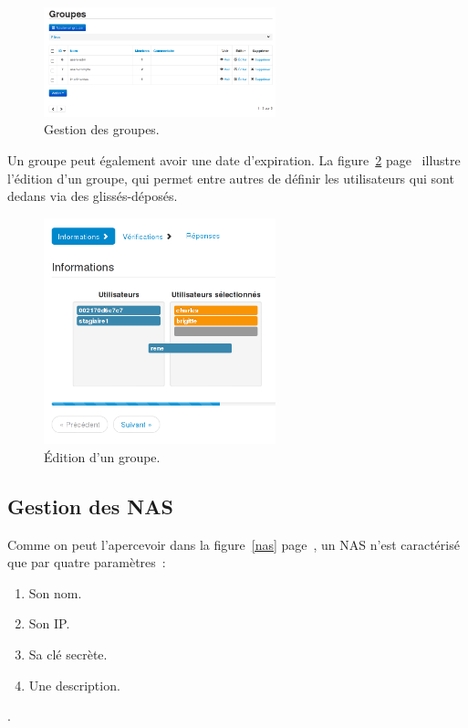 \begin{figure}[!h]
	\begin{center}
	    \includegraphics[width=0.6\textwidth]{img/groupes.png}
	\end{center}
	\caption{Gestion des groupes.}
	\label{groupes}
\end{figure}

Un groupe peut également avoir une date d'expiration. La figure~\ref{groupesedit} page~\pageref{groupesedit} illustre l'édition d'un groupe, qui permet entre autres de définir les utilisateurs qui sont dedans via des glissés-déposés.

\begin{figure}[!h]
	\begin{center}
	    \includegraphics[width=0.6\textwidth]{img/groupesedit.png}
	\end{center}
	\caption{Édition d'un groupe.}
	\label{groupesedit}
\end{figure}

\subsection{Gestion des NAS}

Comme on peut l'apercevoir dans la figure~\ref{nas} page~\pageref{nas}, un NAS n'est caractérisé que par quatre paramètres~:

\begin{enumerate}
\item Son nom.
\item Son IP.
\item Sa clé secrète.
\item Une description.
\end{enumerate}.


